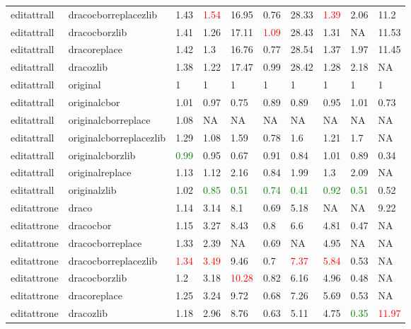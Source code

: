 \begin{landscape}
\begin{longtable}{llllllllll}
\rowcolor{lightgray}  editattrall & dracocborreplacezlib & 1.43 & \textcolor{red}{1.54} & 16.95 & 0.76 & 28.33 & \textcolor{red}{1.39} & 2.06 & 11.2\\
\rowcolor{lightgray}  editattrall & dracocborzlib & 1.41 & 1.26 & 17.11 & \textcolor{red}{1.09} & 28.43 & 1.31 & NA & 11.53\\
\rowcolor{lightgray}  editattrall & dracoreplace & 1.42 & 1.3 & 16.76 & 0.77 & 28.54 & 1.37 & 1.97 & 11.45\\
\rowcolor{lightgray}  editattrall & dracozlib & 1.38 & 1.22 & 17.47 & 0.99 & 28.42 & 1.28 & 2.18 & NA\\
\rowcolor{lightgray}  editattrall & original & 1 & 1 & 1 & 1 & 1 & 1 & 1 & 1\\
\rowcolor{lightgray}  editattrall & originalcbor & 1.01 & 0.97 & 0.75 & 0.89 & 0.89 & 0.95 & 1.01 & 0.73\\
\rowcolor{lightgray}  editattrall & originalcborreplace & 1.08 & NA & NA & NA & NA & NA & NA & NA\\
\rowcolor{lightgray}  editattrall & originalcborreplacezlib & 1.29 & 1.08 & 1.59 & 0.78 & 1.6 & 1.21 & 1.7 & NA\\
editattrall & originalcborzlib & \textcolor{green}{0.99} & 0.95 & 0.67 & 0.91 & 0.84 & 1.01 & 0.89 & 0.34\\
editattrall & originalreplace & 1.13 & 1.12 & 2.16 & 0.84 & 1.99 & 1.3 & 2.09 & NA\\
editattrall & originalzlib & 1.02 & \textcolor{green}{0.85} & \textcolor{green}{0.51} & \textcolor{green}{0.74} & \textcolor{green}{0.41} & \textcolor{green}{0.92} & \textcolor{green}{0.51} & 0.52\\
editattrone & draco & 1.14 & 3.14 & 8.1 & 0.69 & 5.18 & NA & NA & 9.22\\
editattrone & dracocbor & 1.15 & 3.27 & 8.43 & 0.8 & 6.6 & 4.81 & 0.47 & NA\\
editattrone & dracocborreplace & 1.33 & 2.39 & NA & 0.69 & NA & 4.95 & NA & NA\\
editattrone & dracocborreplacezlib & \textcolor{red}{1.34} & \textcolor{red}{3.49} & 9.46 & 0.7 & \textcolor{red}{7.37} & \textcolor{red}{5.84} & 0.53 & NA\\
editattrone & dracocborzlib & 1.2 & 3.18 & \textcolor{red}{10.28} & 0.82 & 6.16 & 4.96 & 0.48 & NA\\
editattrone & dracoreplace & 1.25 & 3.24 & 9.72 & 0.68 & 7.26 & 5.69 & 0.53 & NA\\
editattrone & dracozlib & 1.18 & 2.96 & 8.76 & 0.63 & 5.11 & 4.75 & \textcolor{green}{0.35} & \textcolor{red}{11.97}\\

\end{longtable}
\end{landscape}
